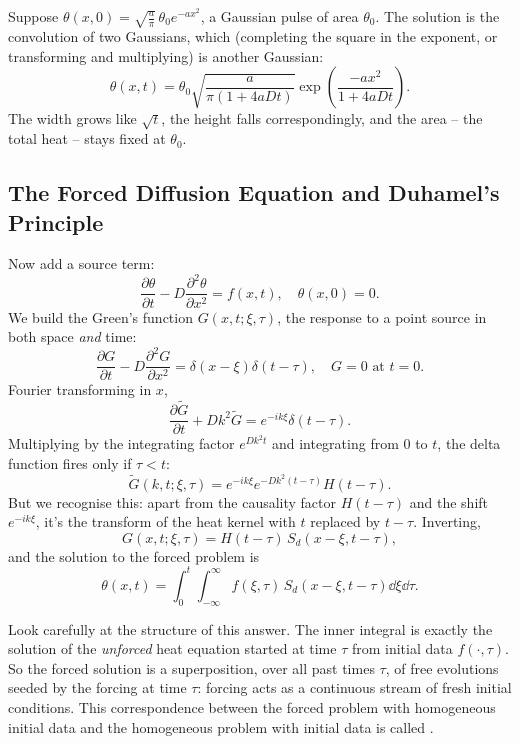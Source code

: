\documentclass[a4paper]{scrartcl}
\begin{document}
\begin{example}
    Suppose $\theta(x, 0) = \sqrt{\frac{a}{\pi}}\,\theta_0 e^{-ax^2}$, a Gaussian pulse of area $\theta_0$. The solution is the convolution of two Gaussians, which (completing the square in the exponent, or transforming and multiplying) is another Gaussian:
    $$
    \theta(x, t) = \theta_0\sqrt{\frac{a}{\pi(1 + 4aDt)}} \exp\left(\frac{-a x^2}{1 + 4 a D t}\right).
    $$
    The width grows like $\sqrt{t}$, the height falls correspondingly, and the area -- the total heat -- stays fixed at $\theta_0$.
\end{example}

\subsection{The Forced Diffusion Equation and Duhamel's Principle}

Now add a source term:
$$
\frac{\partial \theta}{\partial t} - D\frac{\partial^2 \theta}{\partial x^2} = f(x, t), \quad \theta(x, 0) = 0.
$$
We build the Green's function $G(x, t; \xi, \tau)$, the response to a point source in both space \emph{and} time:
$$
\frac{\partial G}{\partial t} - D \frac{\partial^2 G}{\partial x^2} = \delta(x - \xi) \delta(t - \tau), \quad G = 0 \text{ at } t = 0.
$$
Fourier transforming in $x$,
$$
\frac{\partial \tilde{G}}{\partial t} + Dk^2 \tilde{G} = e^{-ik\xi} \delta(t - \tau).
$$
Multiplying by the integrating factor $e^{Dk^2 t}$ and integrating from $0$ to $t$, the delta function fires only if $\tau < t$:
$$
\tilde{G}(k, t; \xi, \tau) = e^{-ik \xi} e^{-Dk^2 (t - \tau)} H(t - \tau).
$$
But we recognise this: apart from the causality factor $H(t - \tau)$ and the shift $e^{-ik\xi}$, it's the transform of the heat kernel with $t$ replaced by $t - \tau$. Inverting,
$$
G(x, t; \xi, \tau) = H(t - \tau)\, S_d(x - \xi, t - \tau),
$$
and the solution to the forced problem is
$$
\theta(x, t) = \int_0^{t} \int_{-\infty}^{\infty} f(\xi, \tau)\, S_d(x - \xi, t - \tau) \dd \xi \dd \tau.
$$

Look carefully at the structure of this answer. The inner integral is exactly the solution of the \emph{unforced} heat equation started at time $\tau$ from initial data $f(\cdot, \tau)$. So the forced solution is a superposition, over all past times $\tau$, of free evolutions seeded by the forcing at time $\tau$: forcing acts as a continuous stream of fresh initial conditions. This correspondence between the forced problem with homogeneous initial data and the homogeneous problem with initial data is called .
\end{document}
